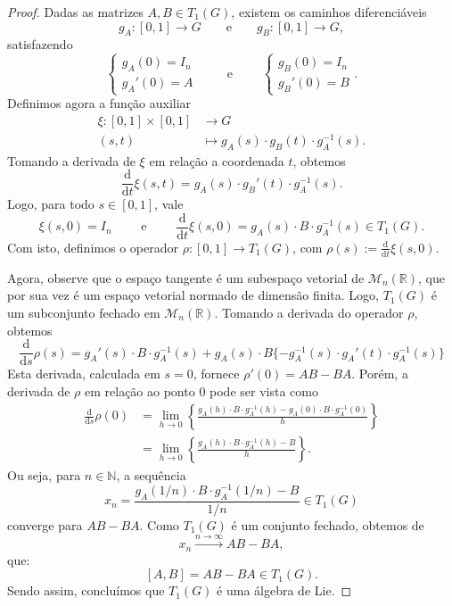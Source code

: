 \documentclass[twoside,openright,titlepage,numbers=noenddot,headinclude,  lineheaders footinclude=true,cleardoublepage=empty,
                                BCOR=5mm,paper=a4,fontsize=12pt ]{scrbook}
\theoremstyle{definition}
\begin{document}
\begin{proof}
Dadas as matrizes $A, B \in T_1(G)$, existem os caminhos diferenciáveis
\[ g_A: [0,1] \rightarrow G \qquad \text{e} \qquad g_B: [0,1] \rightarrow G, \]
satisfazendo
\[
    \begin{cases}
     g_A(0)  = I_n\\
     g_A'(0)  = A 
   \end{cases}
	\qquad 
	\text{ e }
	\qquad
    \begin{cases}
     g_B(0)  = I_n\\
     g_B'(0)  = B 
   \end{cases}
   .
\]
Definimos agora a função auxiliar
\begin{align*}
\xi: [0,1] \times [0,1] & \rightarrow G \\
(s,t) & \mapsto g_A(s) \cdot g_B(t) \cdot g_A^{-1}(s).
\end{align*}
Tomando a derivada de $\xi$ em relação a coordenada $t$, obtemos
\[
\frac{\mathrm d}{\mathrm d t} \xi(s,t) = g_A(s) \cdot g_B'(t) \cdot g_A^{-1}(s) .
\]
Logo, para todo $s \in [0,1]$, vale
\[
\xi(s, 0) = I_n \qquad \text{ e } \qquad \frac{\mathrm d}{\mathrm d t} \xi(s, 0) = g_A(s) \cdot B \cdot g_A^{-1}(s) \in T_1(G).
\]
Com isto, definimos o operador $\rho: [0,1] \rightarrow T_1(G)$, com $\rho(s) := \frac{\mathrm d}{\mathrm d t} \xi(s, 0)$.

Agora, observe que o espaço tangente é um subespaço vetorial de $\mathcal{M}_n(\mathbb{R})$, que por sua vez é um espaço vetorial normado de dimensão
finita. Logo, $T_1(G)$ é um subconjunto fechado em $\mathcal{M}_n(\mathbb{R})$. Tomando a derivada do operador $\rho$, obtemos
\[
\frac{\mathrm d}{\mathrm d s} \rho(s) = g_A'(s) \cdot B \cdot g_A^{-1}(s) + g_A(s) \cdot B \{ -g_A^{-1}(s) \cdot g_A'(t) \cdot g_A^{-1}(s) \}
\]
Esta derivada, calculada em $s = 0$, fornece $\rho'(0) = AB- BA$. Porém, a derivada de $\rho$ em relação ao ponto $0$ pode ser vista como
\begin{align*}
\frac{\mathrm d}{\mathrm d s} \rho(0) & = \lim_{h \rightarrow 0} \left\{ \frac{g_A(h) \cdot B \cdot g_A^{-1}(h) - g_A(0) \cdot B \cdot g_A^{-1}(0)}{h}\right\} \\
 & = \lim_{h \rightarrow 0} \left\{ \frac{g_A(h) \cdot B \cdot g_A^{-1}(h) - B  }{h} \right\}.
\end{align*}
Ou seja, para $n \in \mathbb{N}$, a sequência
\[
x_n = \frac{g_A(1/n) \cdot B \cdot g_A^{-1}(1/n) - B }{1/n} \in T_1(G)
\]
converge para $AB - BA$. Como $T_1(G)$ é um conjunto fechado, obtemos de 
\[ x_n \xrightarrow{n \rightarrow \infty} AB - BA,\] que:
\[ [A, B] = AB - BA \in T_1(G). \]
Sendo assim, concluímos que $T_1(G)$ é uma álgebra de Lie.
\end{proof}
\end{document}
